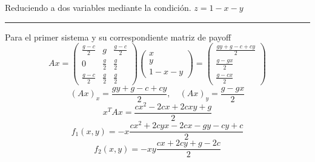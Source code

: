 \documentclass[twocolumn,aps,prl]{revtex4-1}
\newcommand*\sepline{%
  \begin{center}
    \rule[1ex]{.5\textwidth}{.5pt}
  \end{center}}
\begin{document}
Reduciendo a dos variables mediante la condición. $z = 1-x-y$

\sepline

Para el primer sistema y su correspondiente matriz de payoff
$$
Ax = 
\begin{pmatrix}
    \frac{g-c}{2}&g&\frac{g-c}{2}\\
    0&\frac{g}{2}&\frac{g}{2}\\
    \frac{g-c}{2}&\frac{g}{2}&\frac{g}{2}
\end{pmatrix}
\begin{pmatrix}
    x\\
    y\\ 
    1-x-y
\end{pmatrix}
=
\begin{pmatrix}
    \frac{gy+g-c+cy}{2}\\ 
    \frac{g-gx}{2}\\ 
    \frac{g-cx}{2}
\end{pmatrix}
$$
$$
(Ax)_x = \frac{gy+g-c+cy}{2}
,\quad 
(Ax)_y = \frac{g-gx}{2}
$$
$$
x^T Ax = \frac{cx^2-2cx+2cxy+g}{2}
$$
$$
f_1(x, y) = 
-x \frac{
    cx^2
    + 2cyx
    - 2cx
    - gy
    - cy
    + c
    }{2}
$$
$$
f_2(x, y) = 
-xy \frac{cx+2cy+g-2c}{2}
$$
\end{document}
